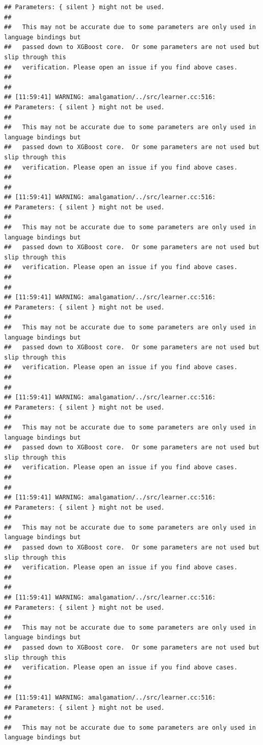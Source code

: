 \documentclass[AMS,STIX2COL]{WileyNJD-v2}\usepackage[]{graphicx}\usepackage[]{color}
\makeatletter
\newenvironment{kframe}{%
 \def\at@end@of@kframe{}%
 \ifinner\ifhmode%
  \def\at@end@of@kframe{\end{minipage}}%
  \begin{minipage}{\columnwidth}%
 \fi\fi%
 \def\FrameCommand##1{\hskip\@totalleftmargin \hskip-\fboxsep
 \colorbox{shadecolor}{##1}\hskip-\fboxsep
     \hskip-\linewidth \hskip-\@totalleftmargin \hskip\columnwidth}%
 \MakeFramed {\advance\hsize-\width
   \@totalleftmargin\z@ \linewidth\hsize
   \@setminipage}}%
 {\par\unskip\endMakeFramed%
 \at@end@of@kframe}
\newenvironment{knitrout}{}{} %
\makeatother
\begin{document}
\begin{knitrout}
\begin{kframe}
\begin{verbatim}
## Parameters: { silent } might not be used.
## 
##   This may not be accurate due to some parameters are only used in language bindings but
##   passed down to XGBoost core.  Or some parameters are not used but slip through this
##   verification. Please open an issue if you find above cases.
## 
## 
## [11:59:41] WARNING: amalgamation/../src/learner.cc:516: 
## Parameters: { silent } might not be used.
## 
##   This may not be accurate due to some parameters are only used in language bindings but
##   passed down to XGBoost core.  Or some parameters are not used but slip through this
##   verification. Please open an issue if you find above cases.
## 
## 
## [11:59:41] WARNING: amalgamation/../src/learner.cc:516: 
## Parameters: { silent } might not be used.
## 
##   This may not be accurate due to some parameters are only used in language bindings but
##   passed down to XGBoost core.  Or some parameters are not used but slip through this
##   verification. Please open an issue if you find above cases.
## 
## 
## [11:59:41] WARNING: amalgamation/../src/learner.cc:516: 
## Parameters: { silent } might not be used.
## 
##   This may not be accurate due to some parameters are only used in language bindings but
##   passed down to XGBoost core.  Or some parameters are not used but slip through this
##   verification. Please open an issue if you find above cases.
## 
## 
## [11:59:41] WARNING: amalgamation/../src/learner.cc:516: 
## Parameters: { silent } might not be used.
## 
##   This may not be accurate due to some parameters are only used in language bindings but
##   passed down to XGBoost core.  Or some parameters are not used but slip through this
##   verification. Please open an issue if you find above cases.
## 
## 
## [11:59:41] WARNING: amalgamation/../src/learner.cc:516: 
## Parameters: { silent } might not be used.
## 
##   This may not be accurate due to some parameters are only used in language bindings but
##   passed down to XGBoost core.  Or some parameters are not used but slip through this
##   verification. Please open an issue if you find above cases.
## 
## 
## [11:59:41] WARNING: amalgamation/../src/learner.cc:516: 
## Parameters: { silent } might not be used.
## 
##   This may not be accurate due to some parameters are only used in language bindings but
##   passed down to XGBoost core.  Or some parameters are not used but slip through this
##   verification. Please open an issue if you find above cases.
## 
## 
## [11:59:41] WARNING: amalgamation/../src/learner.cc:516: 
## Parameters: { silent } might not be used.
## 
##   This may not be accurate due to some parameters are only used in language bindings but

\end{verbatim}
\end{kframe}
\end{knitrout}
\end{document}
